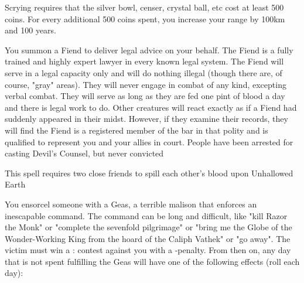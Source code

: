 {Scrying requires that the silver bowl, censer, crystal ball, etc cost at least 500 coins.  For every additional 500 coins spent, you increase your range by 100km and 100 years.

\OCCULT[
  Name=Devil's Counsel,
  Link=occultism-devils-counsel,
  Success=4,
  Cost=See below,
  Widdershins=2
]

You summon a Fiend to deliver legal advice on your behalf.  The Fiend is a fully trained and highly expert lawyer in every known legal system. The Fiend will serve in a legal capacity only and will do nothing illegal (though there are, of course, "gray" areas). They will never engage in combat of any kind, excepting verbal combat. They will serve as long as they are fed one pint of blood a day and there is legal work to do. Other creatures will react exactly as if a Fiend had suddenly appeared in their midst. However, if they examine their records, they will find the Fiend is a registered member of the bar in that polity and is qualified to represent you and your allies in court. People have been arrested for casting Devil's Counsel, but never convicted

This spell requires two close friends to spill each other's blood upon Unhallowed Earth

\OCCULT[
  Name=Geas,
  Link=occultism-geas,
  Success=9,
  Cost=See below,
  Widdershins=3
]

You ensorcel someone with a Geas, a terrible malison that enforces an inescapable command. The command can be long and difficult, like "kill Razor the Monk" or "complete the sevenfold pilgrimage" or "bring me the Globe of the Wonder-Working King from the hoard of the Caliph Vathek" or "go away". The victim must win a \RB : \FOC contest against you with a -\LVL penalty.  From then on, any day that is not spent fulfilling the Geas will have one of the following effects (roll each day):


}

